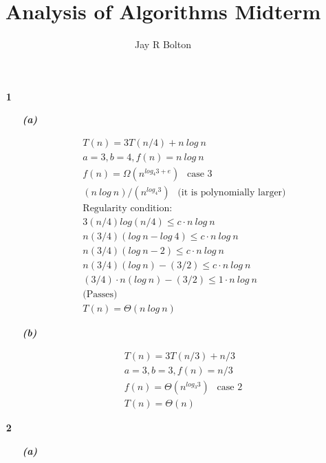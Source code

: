 \documentclass{article}
\title{Analysis of Algorithms Midterm}
\author{Jay R Bolton}
\begin{document}
\maketitle

\begin{enumerate}

\item[\textbf{1}]

	\begin{enumerate}

		\item[\textbf{\emph{{(a)}}}]

		\begin{align*}
			& T(n) = 3T(n/4) + n\ log\ n \\
			& a = 3, b = 4, f(n) = n\ log\ n \\
			& f(n) = \Omega(n^{log_4 3 + e})\ \ \text{ case 3} \\
			& (n\ log\ n) / (n^{log_4 3}) \ \ \text{ (it is polynomially larger)}\\
			& \text{Regularity condition:} \\
			& 3(n/4)log(n/4) \leq c \cdot n\ log\ n \\
			& n(3/4)(log\ n - log\ 4) \leq c \cdot n\ log\ n \\
			& n(3/4)(log\ n - 2) \leq c \cdot n\ log\ n \\
			& n(3/4)(log\ n)-(3/2) \leq c \cdot n\ log\ n \\
			& (3/4) \cdot n(log\ n)-(3/2) \leq 1 \cdot n\ log\ n \\
			& \text{(Passes)} \\\
			& T(n) = \Theta(n\ log\ n)
		\end{align*}

		\item[\textbf{\emph{{(b)}}}]

		\begin{align*}
			& T(n) = 3T(n/3) + n/3 \\
			& a = 3, b = 3, f(n) = n/3 \\
			& f(n) = \Theta(n^{log_3 3})\ \ \text{ case 2} \\
			& T(n) = \Theta(n)
		\end{align*}

	\end{enumerate}

\item[\textbf{2}]

	\begin{enumerate}

		\item[\textbf{\emph{{(a)}}}]


\end{enumerate}
\end{enumerate}
\end{document}
